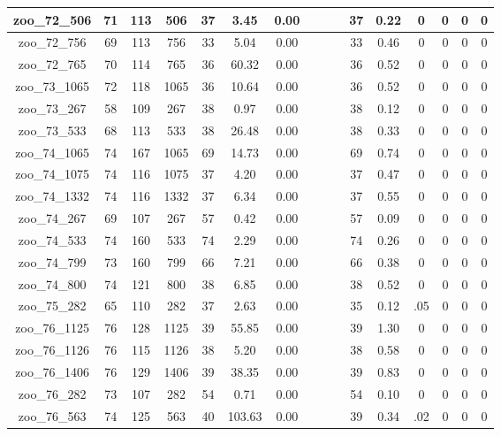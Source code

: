 \begin{landscape}
\begin{longtable}{|c|c|c|c|c|c|c|c|c|c|c|c|c|c|c|c|}
zoo\_72\_506 & 71 & 113 & 506 & 37 & 3.45 & 0.00 &  &  &  & 37 & 0.22 & 0 & 0 & 0 & 0 \\ \hline 
zoo\_72\_756 & 69 & 113 & 756 & 33 & 5.04 & 0.00 &  &  &  & 33 & 0.46 & 0 & 0 & 0 & 0 \\ \hline 
zoo\_72\_765 & 70 & 114 & 765 & 36 & 60.32 & 0.00 &  &  &  & 36 & 0.52 & 0 & 0 & 0 & 0 \\ \hline 
zoo\_73\_1065 & 72 & 118 & 1065 & 36 & 10.64 & 0.00 &  &  &  & 36 & 0.52 & 0 & 0 & 0 & 0 \\ \hline 
zoo\_73\_267 & 58 & 109 & 267 & 38 & 0.97 & 0.00 &  &  &  & 38 & 0.12 & 0 & 0 & 0 & 0 \\ \hline 
zoo\_73\_533 & 68 & 113 & 533 & 38 & 26.48 & 0.00 &  &  &  & 38 & 0.33 & 0 & 0 & 0 & 0 \\ \hline 
zoo\_74\_1065 & 74 & 167 & 1065 & 69 & 14.73 & 0.00 &  &  &  & 69 & 0.74 & 0 & 0 & 0 & 0 \\ \hline 
zoo\_74\_1075 & 74 & 116 & 1075 & 37 & 4.20 & 0.00 &  &  &  & 37 & 0.47 & 0 & 0 & 0 & 0 \\ \hline 
zoo\_74\_1332 & 74 & 116 & 1332 & 37 & 6.34 & 0.00 &  &  &  & 37 & 0.55 & 0 & 0 & 0 & 0 \\ \hline 
zoo\_74\_267 & 69 & 107 & 267 & 57 & 0.42 & 0.00 &  &  &  & 57 & 0.09 & 0 & 0 & 0 & 0 \\ \hline 
zoo\_74\_533 & 74 & 160 & 533 & 74 & 2.29 & 0.00 &  &  &  & 74 & 0.26 & 0 & 0 & 0 & 0 \\ \hline 
zoo\_74\_799 & 73 & 160 & 799 & 66 & 7.21 & 0.00 &  &  &  & 66 & 0.38 & 0 & 0 & 0 & 0 \\ \hline 
zoo\_74\_800 & 74 & 121 & 800 & 38 & 6.85 & 0.00 &  &  &  & 38 & 0.52 & 0 & 0 & 0 & 0 \\ \hline 
zoo\_75\_282 & 65 & 110 & 282 & 37 & 2.63 & 0.00 &  &  &  & 35 & 0.12 & .05 & 0 & 0 & 0 \\ \hline 
zoo\_76\_1125 & 76 & 128 & 1125 & 39 & 55.85 & 0.00 &  &  &  & 39 & 1.30 & 0 & 0 & 0 & 0 \\ \hline 
zoo\_76\_1126 & 76 & 115 & 1126 & 38 & 5.20 & 0.00 &  &  &  & 38 & 0.58 & 0 & 0 & 0 & 0 \\ \hline 
zoo\_76\_1406 & 76 & 129 & 1406 & 39 & 38.35 & 0.00 &  &  &  & 39 & 0.83 & 0 & 0 & 0 & 0 \\ \hline 
zoo\_76\_282 & 73 & 107 & 282 & 54 & 0.71 & 0.00 &  &  &  & 54 & 0.10 & 0 & 0 & 0 & 0 \\ \hline 
zoo\_76\_563 & 74 & 125 & 563 & 40 & 103.63 & 0.00 &  &  &  & 39 & 0.34 & .02 & 0 & 0 & 0 \\ \hline 

\end{longtable}
\end{landscape}
